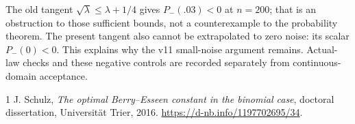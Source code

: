 \documentclass[11pt,a4paper]{article}
\begin{document}
The old tangent $\sqrt\lambda\le\lambda+1/4$ gives
$P_-(.03)<0$ at $n=200$; that is an obstruction to those sufficient bounds,
not a counterexample to the probability theorem. The present tangent also
cannot be extrapolated to zero noise: its scalar $P_-(0)<0$. This explains
why the v11 small-noise argument remains. Actual-law checks and these
negative controls are recorded separately from continuous-domain acceptance.

\begin{thebibliography}{1}
J. Schulz, \emph{The optimal Berry--Esseen constant in the
binomial case}, doctoral dissertation, Universit\"at Trier, 2016.
\url{https://d-nb.info/1197702695/34}.
\end{thebibliography}
\end{document}
